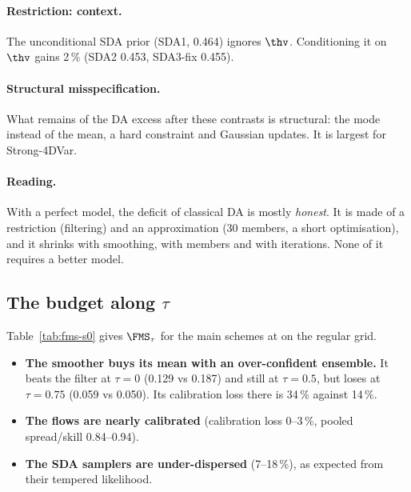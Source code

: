 \paragraph{Restriction: context.}
The unconditional SDA prior (SDA1, 0.464) ignores $\thv$. Conditioning it on
$\thv$ gains 2\,\% (SDA2 0.453, SDA3-fix 0.455). 

\paragraph{Structural misspecification.}
What remains of the DA excess after these contrasts is structural: the mode
instead of the mean, a hard constraint and Gaussian updates. It is largest for
Strong-4DVar.

\paragraph{Reading.}
With a perfect model, the deficit of classical DA is mostly \emph{honest}. It is
made of a restriction (filtering) and an approximation (30 members, a short
optimisation), and it shrinks with smoothing, with members and with iterations.
None of it requires a better model.

\subsection{The budget along \texorpdfstring{$\tau$}{tau}}
Table~\ref{tab:fms-s0} gives $\FMS_\tau$ for the main schemes at \Sz{} on the regular grid.
\begin{itemize}[leftmargin=*]
  \item \textbf{The smoother buys its mean with an over-confident ensemble.} It
    beats the filter at $\tau = 0$ (0.129 vs 0.187) and still at $\tau = 0.5$,
    but loses at $\tau = 0.75$ (0.059 vs 0.050). Its calibration loss there is
    34\,\% against 14\,\%.
  \item \textbf{The flows are nearly calibrated} (calibration loss 0--3\,\%,
    pooled spread/skill 0.84--0.94).
  \item \textbf{The SDA samplers are under-dispersed} (7--18\,\%), as expected
    from their tempered likelihood.
\end{itemize}

